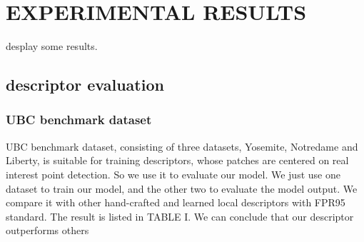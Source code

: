 \documentclass[letterpaper, 10 pt, conference]{ieeeconf}  %
\begin{document}
\section{EXPERIMENTAL RESULTS}
desplay some results.

\subsection{descriptor evaluation}

\subsubsection{UBC benchmark dataset}
UBC benchmark dataset, consisting of three datasets, Yosemite, Notredame and Liberty, is suitable for training descriptors, whose patches are centered on real interest point detection. So we use it to evaluate our model. We just use one dataset to train our model, and the other two to evaluate the model output. We compare it with other hand-crafted and learned local descriptors with FPR95 standard. The result is listed in TABLE I. We can conclude that our descriptor outperforms others
\end{document}
